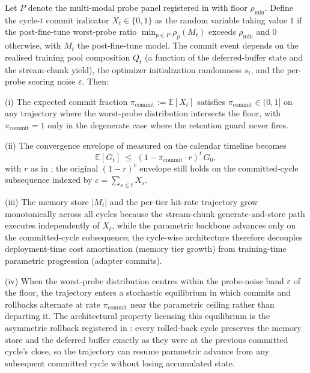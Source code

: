 \begin{heuristic}
\label{cor:stochastic-equilibrium}
Let $P$ denote the multi-modal probe panel registered in  with floor $\rho_{\min}$. Define the cycle-$t$ commit indicator $X_t \in \{0,1\}$ as the random variable taking value $1$ if the post-fine-tune worst-probe ratio $\min_{p \in P} \rho_p(M_t)$ exceeds $\rho_{\min}$ and $0$ otherwise, with $M_t$ the post-fine-tune model. The commit event depends on the realised training pool composition $Q_t$ (a function of the deferred-buffer state and the stream-chunk yield), the optimizer initialization randomness $s_t$, and the per-probe scoring noise $\varepsilon$. Then:

(i) The expected commit fraction $\pi_{\mathrm{commit}} := \mathbb{E}[X_t]$ satisfies $\pi_{\mathrm{commit}} \in (0, 1]$ on any trajectory where the worst-probe distribution intersects the floor, with $\pi_{\mathrm{commit}} = 1$ only in the degenerate case where the retention guard never fires.

(ii) The convergence envelope of  measured on the calendar timeline becomes
\begin{equation}
\mathbb{E}[G_t] \;\le\; (1 - \pi_{\mathrm{commit}} \cdot r)^{t} \, G_0,
\label{eq:thm-stochastic-envelope}
\end{equation}
with $r$ as in ; the original $(1-r)^c$ envelope still holds on the committed-cycle subsequence indexed by $c = \sum_{s \le t} X_s$.

(iii) The memory store $|M_t|$ and the per-tier hit-rate trajectory grow monotonically across all cycles because the stream-chunk generate-and-store path executes independently of $X_t$, while the parametric backbone advances only on the committed-cycle subsequence; the cycle-wise architecture therefore decouples deployment-time cost amortisation (memory tier growth) from training-time parametric progression (adapter commits).

(iv) When the worst-probe distribution centres within the probe-noise band $\varepsilon$ of the floor, the trajectory enters a stochastic equilibrium in which commits and rollbacks alternate at rate $\pi_{\mathrm{commit}}$ near the parametric ceiling rather than departing it. The architectural property licensing this equilibrium is the asymmetric rollback registered in : every rolled-back cycle preserves the memory store and the deferred buffer exactly as they were at the previous committed cycle's close, so the trajectory can resume parametric advance from any subsequent committed cycle without losing accumulated state.


\end{heuristic}
